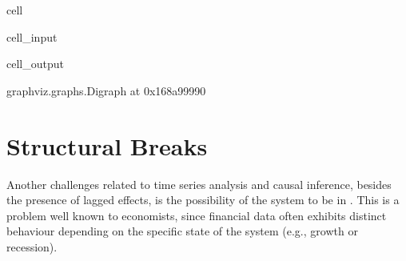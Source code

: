 \documentclass[letterpaper,10pt,english]{jupyterBook}
\begin{document}
\begin{sphinxuseclass}{cell}\begin{sphinxVerbatimInput}

\begin{sphinxuseclass}{cell_input}
\begin{sphinxVerbatim}[commandchars=\\\{\}]
\PYG{p}{[} \PYG{p}{[}\PYG{p}{]}\PYG{p}{]}   
\end{sphinxVerbatim}

\end{sphinxuseclass}\end{sphinxVerbatimInput}
\begin{sphinxVerbatimOutput}

\begin{sphinxuseclass}{cell_output}
\begin{sphinxVerbatim}[commandchars=\\\{\}]
\PYGZlt{}graphviz.graphs.Digraph at 0x168a99990\PYGZgt{}
\end{sphinxVerbatim}

\end{sphinxuseclass}\end{sphinxVerbatimOutput}

\end{sphinxuseclass}
\sphinxstepscope


\chapter{Structural Breaks}
\label{\detokenize{notebooks/structural_breaks_example:structural-breaks}}\label{\detokenize{notebooks/structural_breaks_example::doc}}
\sphinxAtStartPar
Another challenges related to time series analysis and causal inference, besides the presence of lagged effects, is the possibility of the system to be in . This is a problem well known to economists, since financial data often exhibits distinct behaviour depending on the specific state of the system (e.g., growth or recession).
\end{document}
